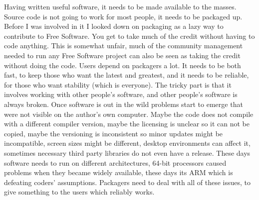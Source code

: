 Having written useful software, it needs to be made available to the masses. Source code is not going to work for most people, it needs to be packaged up. Before I was involved in it I looked down on packaging as a lazy way to contribute to Free Software. You get to take much of the credit without having to code anything. This is somewhat unfair, much of the community management needed to run any Free Software project can also be seen as taking the credit without doing the code.
Users depend on packagers a lot. It needs to be both fast, to keep those who want the latest and greatest, and it needs to be reliable, for those who want stability (which is everyone). The tricky part is that it involves working with other people’s software, and other people’s software is always broken. Once software is out in the wild problems start to emerge that were not visible on the author’s own computer. Maybe the code does not compile with a different compiler version, maybe the licensing is unclear so it can not be copied, maybe the versioning is inconsistent so minor updates might be incompatible, screen sizes might be different, desktop environments can affect it, sometimes necessary third party libraries do not even have a release. These days software needs to run on different architectures, 64-bit processors caused problems when they became widely available, these days its ARM which is defeating coders’ assumptions. Packagers need to deal with all of these issues, to give something to the users which reliably works.

